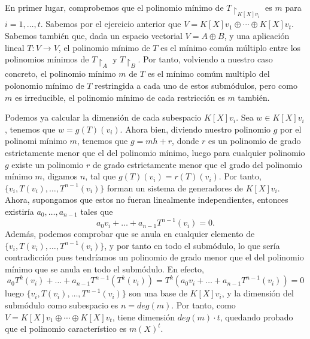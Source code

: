 En primer lugar, comprobemos que el polinomio mínimo de \(T\restriction_{K[X]v_i}\) es \(m\) para \(i = 1, \dots, t\). Sabemos por el ejercicio anterior que \(V = K[X]v_1 \oplus \cdots \oplus K[X]v_t\). Sabemos también que, dada un espacio vectorial \(V = A \oplus B\), y una aplicación lineal \(T:V \rightarrow V\), el polinomio mínimo de \(T\) es el mínimo común múltiplo entre los polinomios mínimos de  \(T\restriction_{A}\) y  \(T\restriction_{B}\). Por tanto, volviendo a nuestro caso concreto, el polinomio mínimo \(m\) de \(T\) es el mínimo comúm multiplo del polonomio mínimo de \(T\) restringida a cada uno de estos submódulos, pero como \(m\) es irreducible, el polinomio mínimo de cada restricción es  \(m\) también.

Podemos ya calcular la dimensión de cada subespacio \(K[X]v_i\). Sea \(w \in K[X]v_i\), tenemos que  \(w = g(T)(v_i)\). Ahora bien, diviendo nuestro polinomio  \(g\) por el polinomi mínimo  \(m\), tenemos que  \(g = mh + r\), donde \(r\) es un polinomio de grado estrictamente menor que el del polinomio mínimo, luego para cualquier polinomio \(g\) existe un polinomio \(r\) de grado estrictamente menor que el grado del polinomio mínimo \(m\), digamos \(n\), tal que \(g(T)(v_i) = r(T)(v_i)\). Por tanto, \(\{v_i, T(v_i), \dots, T^{n-1}(v_i)\}\) forman un sistema de generadores de \(K[X]v_i\). \\

Ahora, supongamos que estos no fueran linealmente independientes, entonces existiría \(a_0, \dots, a_{n-1}\) tales que
\[
a_0v_i + \dots + a_{n-1}T^{n-1}(v_i) = 0
.\]
Además, podemos comprobar que se anula en cualquier elemento de \(\{v_i, T(v_i), \dots, T^{n-1}(v_i)\}\), y por tanto en todo el submódulo, lo que sería contradicción pues tendríamos un polinomio de grado menor que el del polinomio mínimo que se anula en todo el submódulo. En efecto,
\[
a_0T^k(v_i) + \dots + a_{n-1}T^{n-1}(T^k(v_i)) = T^k(a_0v_i + \dots + a_{n-1}T^{n-1}(v_i)) = 0
\]
luego \(\{v_i, T(v_i), \dots, T^{n-1}(v_i)\}\) son una base de \(K[X]v_i\), y la dimensión del submódulo como subespacio es \(n = deg(m)\). Por tanto, como \(V = K[X]v_1 \oplus \cdots \oplus K[X]v_t\), tiene dimensión \(deg(m) \cdot t\), quedando probado que el polinomio característico es  \(m(X)^t\).
